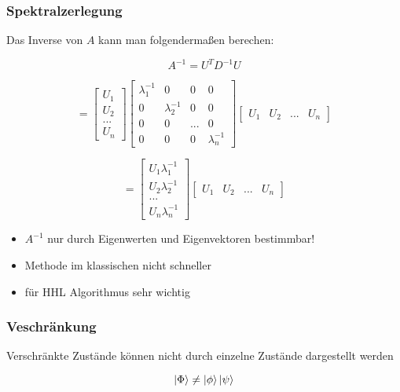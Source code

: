 \begin{frame}
    \frametitle{Spektralzerlegung}
    Das Inverse von $A$ kann man folgendermaßen berechen:

    $$A^{-1}=  U^T D^{-1} U$$

    $$=\begin{bmatrix} U_1\\ U_2\\ ...\\ U_n\end{bmatrix} 
    \begin{bmatrix} \lambda_1^{-1} & 0 & 0 & 0\\ 0 & \lambda_2^{-1} &0 & 0\\ 0 & 0 & ... & 0\\ 0 & 0 & 0& \lambda_n^{-1} \end{bmatrix} 
    \begin{bmatrix} U_1&U_2&...&U_n \end{bmatrix}$$

 $$=\begin{bmatrix} U_1 \lambda_1^{-1} \\ U_2 \lambda_2^{-1}\\ ...\\ U_n \lambda_n^{-1} \end{bmatrix} 
    \begin{bmatrix} U_1&U_2&...&U_n \end{bmatrix}$$

    \hfil

    \begin{itemize}
        \item  $A^{-1}$ nur durch Eigenwerten und Eigenvektoren bestimmbar!
        \item  Methode im klassischen nicht schneller
        \item  für HHL Algorithmus sehr wichtig
   \end{itemize}
\end{frame}

\begin{frame}
    \frametitle{Veschränkung}
    
    Verschränkte Zustände können nicht durch einzelne Zustände dargestellt werden

    \hfil

    $$\ket{\Phi} \neq \ket{\phi} \ket{\psi}$$

\end{frame}

